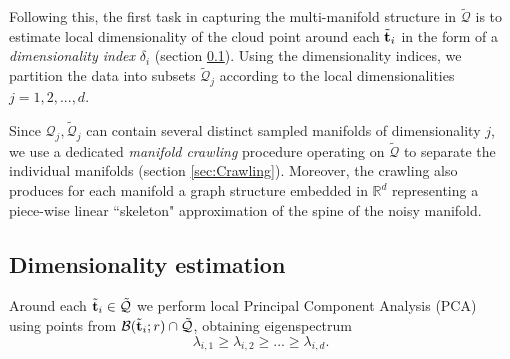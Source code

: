 Following this, the first task in capturing the multi-manifold structure in $\tilde{\mathcal{Q}}$ is to estimate local dimensionality of the cloud point around each $\tilde{\boldsymbol{\mathbf{t}}}_i$
in the form of a \emph{dimensionality index} $\delta_i$ (section \ref{sec:D_Index}).
Using the dimensionality indices, we partition the data into subsets $\tilde{\mathcal{Q}}_j$ according to the local dimensionalities $j=1,2,...,d$.

Since $\mathcal{Q}_j, \tilde{\mathcal{Q}}_j$ can contain several distinct sampled manifolds of dimensionality $j$,
we use a dedicated \emph{manifold crawling} procedure operating on $\tilde{\mathcal{Q}}$ to separate the individual manifolds (section \ref{sec:Crawling}).
Moreover, the crawling also produces for each manifold a graph structure embedded in $\mathbb{R}^d$ representing a piece-wise linear ``skeleton" approximation of the spine of the noisy manifold.




\subsection{Dimensionality estimation} \label{sec:D_Index}
Around each $\tilde{\boldsymbol{\mathbf{t}}}_i \in \tilde{ \mathcal{Q}}$ we perform local Principal Component Analysis (PCA) using points from  $\mathcal{B}(\tilde{\boldsymbol{\mathbf{t}}}_i;r) \cap \tilde {\mathcal{Q}}$, obtaining eigenspectrum
\[\lambda_{i,1} \ge \lambda_{i,2} \ge ... \ge \lambda_{i,d}.\]

